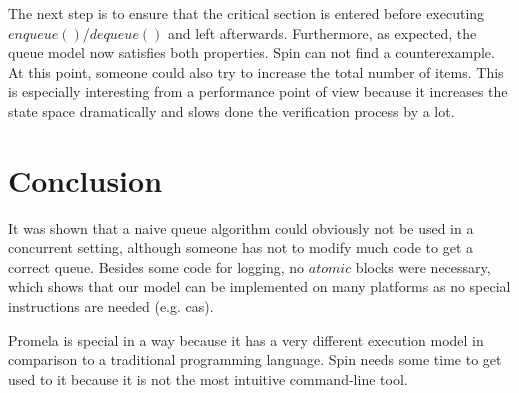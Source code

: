 \documentclass{article}
\begin{document}
The next step is to ensure that the critical section is entered before executing $enqueue()$/$dequeue()$ and left afterwards. 
Furthermore, as expected, the queue model now satisfies both properties. Spin can not find a counterexample. 
At this point, someone could also try to increase the total number of items. 
This is especially interesting from a performance point of view because it increases the state space dramatically and slows done the verification process by a lot.

\section{Conclusion}
It was shown that a naive queue algorithm could obviously not be used in a concurrent setting, 
although someone has not to modify much code to get a correct queue.
Besides some code for logging, no $atomic$ blocks were necessary, which shows that our model can be implemented on many platforms as no special instructions are needed (e.g. cas). 

Promela is special in a way because it has a very different execution model in comparison to a traditional programming language. Spin needs some time to get used to it because it is not the most intuitive command-line tool. 
\end{document}
